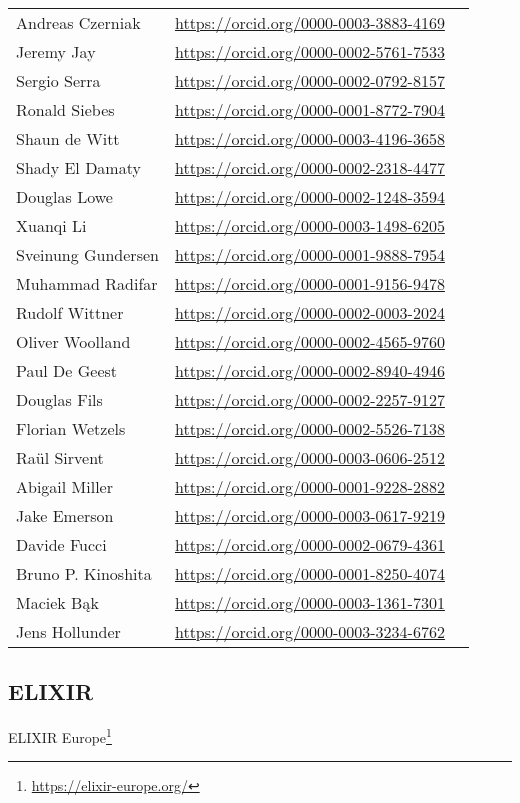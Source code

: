 \begin{longtable}{lll}
  Andreas Czerniak & \url{https://orcid.org/0000-0003-3883-4169}
\\
  Jeremy Jay & \url{https://orcid.org/0000-0002-5761-7533}
\\
  Sergio Serra & \url{https://orcid.org/0000-0002-0792-8157}
\\
  Ronald Siebes & \url{https://orcid.org/0000-0001-8772-7904}
\\
  Shaun de Witt & \url{https://orcid.org/0000-0003-4196-3658}
\\
  Shady El Damaty & \url{https://orcid.org/0000-0002-2318-4477}
\\
  Douglas Lowe & \url{https://orcid.org/0000-0002-1248-3594}
\\
  Xuanqi Li & \url{https://orcid.org/0000-0003-1498-6205}
\\
  Sveinung Gundersen & \url{https://orcid.org/0000-0001-9888-7954}
\\
  Muhammad Radifar & \url{https://orcid.org/0000-0001-9156-9478}
\\
  Rudolf Wittner & \url{https://orcid.org/0000-0002-0003-2024}
\\
  Oliver Woolland & \url{https://orcid.org/0000-0002-4565-9760}
\\
  Paul De Geest & \url{https://orcid.org/0000-0002-8940-4946}
\\
  Douglas Fils & \url{https://orcid.org/0000-0002-2257-9127}
\\
  Florian Wetzels & \url{https://orcid.org/0000-0002-5526-7138}
\\
  Raül Sirvent & \url{https://orcid.org/0000-0003-0606-2512}
\\
  Abigail Miller & \url{https://orcid.org/0000-0001-9228-2882}
\\
  Jake Emerson & \url{https://orcid.org/0000-0003-0617-9219}
\\
  Davide Fucci & \url{https://orcid.org/0000-0002-0679-4361}
\\
  Bruno P. Kinoshita & \url{https://orcid.org/0000-0001-8250-4074}
\\
  Maciek Bąk & \url{https://orcid.org/0000-0003-1361-7301}  
\\
  Jens Hollunder & \url{https://orcid.org/0000-0003-3234-6762}
\end{longtable}


\subsection{ELIXIR}
ELIXIR Europe\footnote{\url{https://elixir-europe.org/}}

